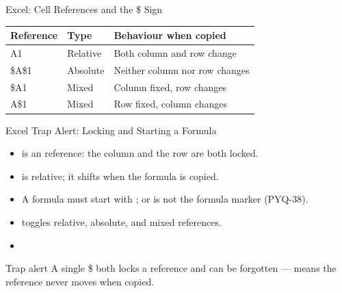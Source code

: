 \documentclass[aspectratio=169]{beamer}
\begin{document}
\begin{frame}{Excel: Cell References and the \$ Sign}
  \begin{center}
    \begin{tabular}{p{}p{}p{}}
      \toprule
      \textbf{Reference} & \textbf{Type} & \textbf{Behaviour when copied} \\
      \midrule
      A1 & Relative & Both column and row change \\
      \$A\$1 & Absolute & Neither column nor row changes \\
      \$A1 & Mixed & Column fixed, row changes \\
      A\$1 & Mixed & Row fixed, column changes \\
      \bottomrule
    \end{tabular}
  \end{center}
  \vspace{0.25cm}
\end{frame}

\begin{frame}{Excel Trap Alert: Locking and Starting a Formula}
  \begin{itemize}
    \item {} is an  reference: the column and the row
      are both locked.
    \item {} is relative; it shifts when the formula is copied.
    \item A formula must start with \key{=}; \key{+} or \key{\%} is not the
      formula marker (PYQ-38).
    \item {} toggles relative, absolute, and mixed references.
    \item {}
  \end{itemize}
  \begin{alertblock}{Trap alert}
    A single \$ both locks a reference and can be forgotten --- 
    means the reference never moves when copied.
  \end{alertblock}
\end{frame}
\end{document}
